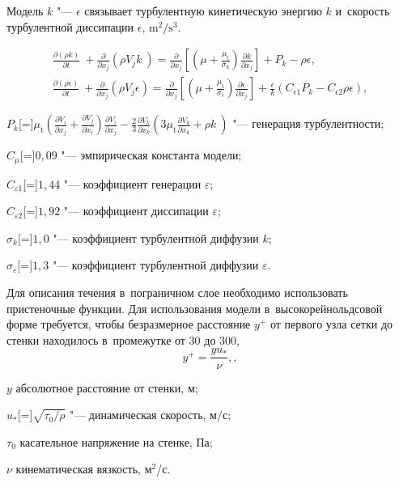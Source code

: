 Модель \(k\) "--- \(\epsilon\) \autocite{Launder1974} связывает турбулентную кинетическую энергию \(k\) и~скорость турбулентной диссипации \(\epsilon\), \(\si\meter^2/\si\second^3\).

\begin{subequations}
	\begin{gather}
	\frac{\partial(\rho k)}{\partial t}~+ \frac{\partial}{\partial x_j}\left(\rho V_j k~\right) = \frac{\partial}{\partial x_j} \left[ \left(\mu+\frac{\mu_\text{t}}{\sigma_k} \right) \frac{\partial k}{\partial x_j} \right] + P_k - \rho\epsilon, \\
	\frac{\partial(\rho \epsilon)}{\partial t}~+ \frac{\partial}{\partial x_j}\left(\rho V_j \epsilon \right) = \frac{\partial}{\partial x_j} \left[ \left(\mu+\frac{\mu_\text{t}}{\sigma_\epsilon} \right) \frac{\partial \epsilon}{\partial x_j} \right] + \frac{\epsilon}{k}(C_{\epsilon 1}P_k - C_{\epsilon 2}\rho\epsilon),
	\end{gather}
\end{subequations}
\begin{eqexpl}
	\item{\(P_k\)}[=]\(\mu_\text{t} \left( \frac{\partial V_i}{\partial x_j} + \frac{\partial V_j}{\partial x_i} \right)\frac{\partial V_i}{\partial x_j} - \frac{2}{3}\frac{\partial V_k}{\partial x_k}\left(3 \mu_\text{t} \frac{\partial V_k}{\partial x_k} + \rho k~\right)\) "--- генерация турбулентности;
	\item{\(C_\mu\)}[=]\(0,09\) "--- эмпирическая константа модели;
	\item{\(C_{\varepsilon 1}\)}[=]\(1,44\) "--- коэффициент генерации \(\varepsilon\);
	\item{\(C_{\varepsilon 2}\)}[=]\(1,92\) "--- коэффициент диссипации \(\varepsilon\);
	\item{\(\sigma_k\)}[=]\(1,0\) "--- коэффициент турбулентной диффузии \(k\);
	\item{\(\sigma_\varepsilon\)}[=]\(1,3\) "--- коэффициент турбулентной диффузии \(\varepsilon\).
\end{eqexpl}

Для описания течения в~пограничном слое необходимо использовать пристеночные функции.
Для использования модели в~высокорейнольдсовой форме требуется, чтобы безразмерное расстояние \(y^+\) от первого узла сетки до стенки находилось в~промежутке от 30 до 300,
\begin{equation}
	y^+=\frac{y u_*}{\nu}, \label{eq:y_plus},
\end{equation}
\begin{eqexpl}
	\item{\(y\)} абсолютное расстояние от стенки, м;
	\item{\(u_*\)}[=]\(\sqrt{\tau_0 / \rho}\) "--- динамическая скорость, м/с;
	\item{\(\tau_0\)} касательное напряжение на стенке, Па;
	\item{\(\nu\)} кинематическая вязкость, \(\text{м}^2\)/с.
\end{eqexpl}

